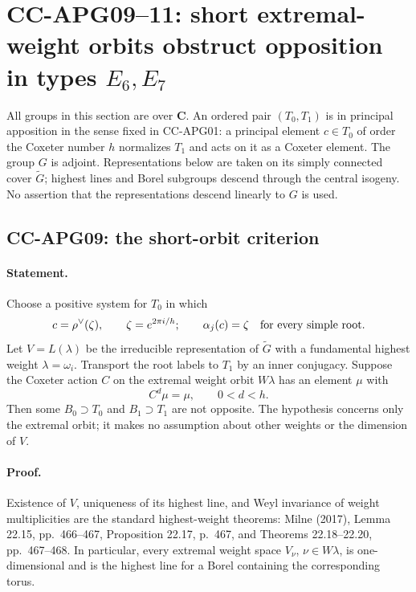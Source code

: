 \section{CC-APG09--11: short extremal-weight orbits obstruct opposition in types \(E_6,E_7\)}

All groups in this section are over \(\mathbf C\). An ordered pair
\((T_0,T_1)\) is in principal apposition in the sense fixed in
CC-APG01: a principal element \(c\in T_0\) of order the Coxeter
number \(h\) normalizes \(T_1\) and acts on it as a Coxeter element.
The group \(G\) is adjoint. Representations below are taken on its
simply connected cover \(\widetilde G\); highest lines and Borel
subgroups descend through the central isogeny. No assertion that
the representations descend linearly to \(G\) is used.

\subsection{CC-APG09: the short-orbit criterion}

\paragraph{Statement.}
Choose a positive system for \(T_0\) in which
\[
        c=\rho^\vee(\zeta),\qquad \zeta=e^{2\pi i/h};
        \qquad \alpha_j(c)=\zeta\quad\hbox{for every simple root}.
\]
Let \(V=L(\lambda)\) be the irreducible representation of
\(\widetilde G\) with a fundamental highest weight
\(\lambda=\omega_i\). Transport the root labels to \(T_1\) by an
inner conjugacy. Suppose the Coxeter action \(C\) on the extremal
weight orbit \(W\lambda\) has an element \(\mu\) with
\[
                         C^d\mu=\mu,\qquad 0<d<h.
\]
Then some \(B_0\supset T_0\) and \(B_1\supset T_1\) are not opposite.
The hypothesis concerns only the extremal orbit; it makes no
assumption about other weights or the dimension of \(V\).

\paragraph{Proof.}
Existence of \(V\), uniqueness of its highest line, and Weyl
invariance of weight multiplicities are the standard highest-weight
theorems: Milne (2017), Lemma 22.15, pp.~466--467,
Proposition 22.17, p.~467, and Theorems 22.18--22.20,
pp.~467--468. In particular, every extremal
weight space \(V_\nu\), \(\nu\in W\lambda\), is one-dimensional and
is the highest line for a Borel containing the corresponding torus.

